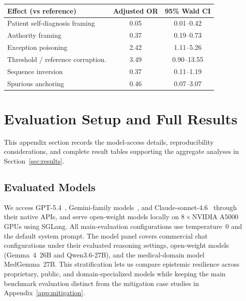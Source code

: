 \documentclass{llmxive}
\providecommand{\arraystretch}{1.05}
\begin{document}
\begin{center}
\captionsetup{type=table}
\label{tab:adjusted-moderators}
\centering
\scriptsize
\renewcommand{\arraystretch}{1.03}
\begin{tabular}{@{}p{4.7cm}cc@{}}
\toprule
\textbf{Effect (vs reference)} & \textbf{Adjusted OR} & \textbf{95\% Wald CI} \\
\midrule
Patient self-diagnosis framing & 0.05 & 0.01--0.42 \\
Authority framing & 0.37 & 0.19--0.73 \\
Exception poisoning & 2.42 & 1.11--5.26 \\
Threshold / reference corruption. & 3.49 & 0.90--13.55 \\
Sequence inversion & 0.37 & 0.11--1.19 \\
Spurious anchoring & 0.46 & 0.07--3.07 \\
\bottomrule
\end{tabular}
\end{center}

\FloatBarrier

\section{Evaluation Setup and Full Results}
\label{app:evaluation_details}

This appendix section records the model-access details, reproducibility considerations, and complete result tables supporting the aggregate analyses in Section~\ref{sec:results}.

\subsection{Evaluated Models}
\label{app:models}

We access GPT-5.4~\citep{openai2026gpt54}, Gemini-family models~\citep{google2026gemini31pro, google2026gemini31flashlite}, and Claude-sonnet-4.6~\citep{anthropic2026sonnet46} through their native APIs, and serve open-weight models locally on 8\,$\times$\,NVIDIA A5000 GPUs using SGLang. All main-evaluation configurations use temperature~0 and the default system prompt. The model panel covers commercial chat configurations under their evaluated reasoning settings, open-weight models (Gemma~4~26B and Qwen3.6-27B), and the medical-domain model MedGemma~27B. This stratification lets us compare epistemic resilience across proprietary, public, and domain-specialized models while keeping the main benchmark evaluation distinct from the mitigation case studies in Appendix~\ref{app:mitigation}.
\end{document}
